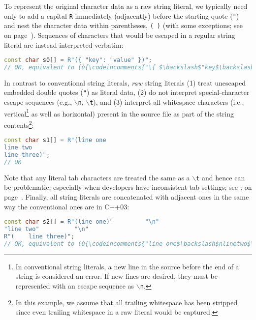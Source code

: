 \noindent To represent the original character
data as a raw string literal, we typically need only to add a capital \texttt{R} immediately
(adjacently) before the starting quote (\texttt{"}) and nest the
character data within parentheses, \texttt{(}~\texttt{)} (with some exceptions; see \textit{} on page~\pageref{collisions}). Sequences of
characters that would be escaped in a regular string literal are instead
interpreted verbatim:

\begin{lstlisting}[language=C++]
const char s0[] = R"({ "key": "value" })";
// OK, equivalent to (ù{\codeincomments{"\{ $\backslash$"key$\backslash$": $\backslash$"value$\backslash$" \}"}}ù)
\end{lstlisting}

\noindent In contrast to conventional string literals, \emph{raw} string literals
(1) treat unescaped embedded double quotes (\texttt{"}) as literal data,
(2) do not interpret special-character escape sequences (e.g.,
\texttt{$\backslash$n}, \texttt{$\backslash$t}), and (3) interpret all
whitespace characters (i.e., vertical\footnote{In conventional string literals, a
new line in the source before the end of a string is considered an error.
If new lines are desired, they must be represented with an escape
sequence as \texttt{$\backslash$n}.} as well as horizontal) present in
the source file as part of the string contents{\cprotect\footnote{In
this example, we assume that all trailing whitespace has been stripped
since even trailing whitespace in a raw literal would be captured.}}:


\begin{lstlisting}[language=C++]
const char s1[] = R"(line one
line two
line three)";
// OK
\end{lstlisting}

\noindent Note that any literal tab characters are treated the same as a
\texttt{$\backslash$t} and hence can be problematic, especially when
developers have inconsistent tab settings; see \textit{: } on page~\pageref{unexpected-indentation}. Finally, all string literals are concatenated with
adjacent ones in the same way the conventional ones are in C++03:

\begin{lstlisting}[language=C++]
const char s2[] = R"(line one)"         "\n"
"line two"          "\n"
R"(    line three)";
// OK, equivalent to (ù{\codeincomments{"line one$\backslash$nlinetwo$\backslash$n~~~~line three"}}ù)
\end{lstlisting}



